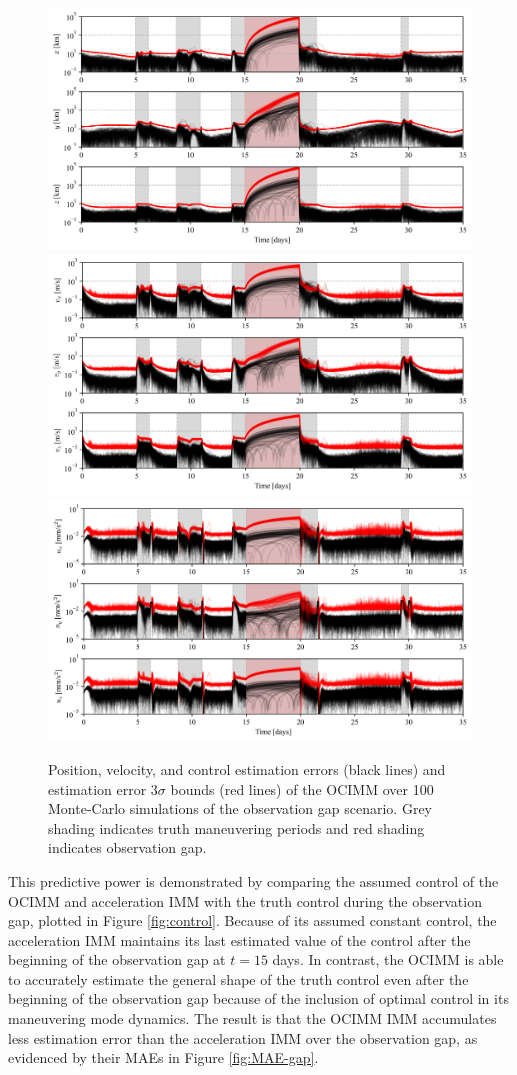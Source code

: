 \documentclass[letterpaper, preprint, paper,11pt]{AAS}	%
\begin{document}
\begin{figure}
    \centering
    \includegraphics[width=0.85\linewidth]{Figures/position_3sigmas.png}
    \includegraphics[width=0.85\linewidth]{Figures/velocity_3sigmas.png}
    \includegraphics[width=0.85\linewidth]{Figures/control_3sigmas.png}
    \caption{Position, velocity, and control estimation errors (black lines) and estimation error $3\sigma$ bounds (red lines) of the OCIMM over 100 Monte-Carlo simulations of the observation gap scenario. Grey shading indicates truth maneuvering periods and red shading indicates observation gap.}
    \label{fig:three-sigmas}
\end{figure}

This predictive power is demonstrated by comparing the assumed control of the OCIMM and acceleration IMM with the truth control during the observation gap, plotted in Figure \ref{fig:control}. Because of its assumed constant control, the acceleration IMM maintains its last estimated value of the control after the beginning of the observation gap at $t=15$ days. In contrast, the OCIMM is able to accurately estimate the general shape of the truth control even after the beginning of the observation gap because of the inclusion of optimal control in its maneuvering mode dynamics. The result is that the OCIMM IMM accumulates less estimation error than the acceleration IMM over the observation gap, as evidenced by their MAEs in Figure \ref{fig:MAE-gap}. 
\end{document}

